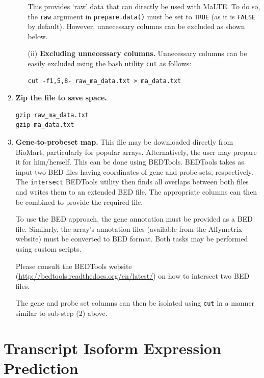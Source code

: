 \documentclass[a4paper,12pt]{article}
\begin{document}
\begin{enumerate}
\begin{enumerate}
This provides `raw' data that can directly be used with \textsf{MaLTE}. To do so, the \texttt{raw} argument in \texttt{prepare.data()} must be set to \texttt{TRUE} (as it is \texttt{FALSE} by default). However, unnecessary columns can be excluded as shown below.

\item[(ii)] \textbf{Excluding unnecessary columns.} Unnecessary columns can be easily excluded using the bash utility \texttt{cut} as follows:

\begin{verbatim}
cut -f1,5,8- raw_ma_data.txt > ma_data.txt
\end{verbatim}

\end{enumerate}

\item \textbf{Zip the file to save space.}
\begin{verbatim}
gzip raw_ma_data.txt
gzip ma_data.txt
\end{verbatim}

\item \textbf{Gene-to-probeset map.} This file may be downloaded directly from \textsf{BioMart}, particularly for popular arrays. Alternatively, the user may prepare it for him/herself. This can be done using \textsf{BEDTools}. \textsf{BEDTools} takes as input two BED files having coordinates of gene and probe sets, respectively. The \texttt{intersect} \textsf{BEDTools} utility then finds all overlaps between both files and writes them to an extended BED file. The appropriate columns can then be combined to provide the required file.

To use the BED approach, the gene annotation must be provided as a BED file. Similarly, the array's annotation files (available from the Affymetrix website) must be converted to BED format. Both tasks may be performed using custom scripts.

Please consult the \textsf{BEDTools} website (\url{http://bedtools.readthedocs.org/en/latest/}) on how to intersect two BED files.

The gene and probe set columns can then be isolated using \texttt{cut} in a manner similar to sub-step (2) above.
\end{enumerate}


\section{Transcript Isoform Expression Prediction}
\label{tiep}
\end{document}
